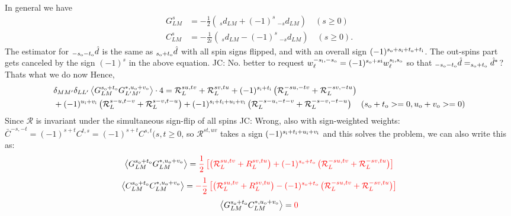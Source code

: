 \documentclass[reprint,prd, superscriptaddress, tightenlines, longbibliography, nofootinbib, eqsecnum, amsfonts, amsmath, floatfix, notitlepage, onecolumn]{revtex4-1}
\newcommand{\si}[0]{{s_{\rm i}}}
\newcommand{\ti}[0]{{t_{\rm i}}}
\newcommand{\ui}[0]{{u_{\rm i}}}
\newcommand{\vi}[0]{{v_{\rm i}}}
\newcommand{\so}[0]{{s_{\rm o}}}
\renewcommand{\to}[0]{{t_{\rm o}}}
\newcommand{\uo}[0]{{u_{\rm o}}}
\newcommand{\vo}[0]{{v_{\rm o}}}
\newcommand{\av}[1]{\left\langle #1 \right\rangle}
\newcommand{\red}[1]{\color{red}#1 \color{black} }
\newcommand{\JC}[1]{\color{red}JC: #1\color{black}}
\begin{document}
In general we have
\begin{eqnarray*}
		G^{s}_{LM} &= -\frac 12\left(\:_s d_{LM} + (-1)^s \:_{-s} d_{LM}\right) \quad (s \geq 0) \\
		C^{s}_{LM} &=-\frac 1{2i} \left( \:_s d_{LM} - (-1)^s \:_{-s} d_{LM} \right) \quad (s \geq 0).
\end{eqnarray*}
The estimator for $_{-\so - \to}\hat d$ is the same as $_{\so + \to}\hat d$ with all spin signs flipped, and with an overall sign $(-1)^{\so + \si + \to + \ti}$. The out-spins part gets canceled by the sign $(-1)^s$ in the above equation. \JC{No. better to request $w_\ell^{-\si, -\so} = (-1)^{\so + si}w_\ell^{\si,\so} $ so that $_{-\so - \to}\hat d = _{\so + \to}\hat d^*$? Thats what we do now}
Hence,
\begin{equation}
\begin{split}
			&\delta_{MM'}\delta_{LL'}\av{G^{\so + \to}_{LM} G^{*,\uo + \vo}_{L'M'} }\cdot 4 =\mathcal R^{su, tv}_L + \mathcal R^{sv, tu}_L + (-1)^{\si + \ti}\left(\mathcal R^{-su, -tv}_L + \mathcal R_L^{-sv, -tu} \right) \\&+ (-1)^{\ui + \vi}\left(\mathcal R^{s-u, t-v}_L + \mathcal R_L^{s-v, t-u}\right) + (-1)^{\si + \ti + \ui + \vi}\left(\mathcal R^{-s-u, -t-v}_L + \mathcal R_L^{-s-v, -t-u}\right)\quad (\so + \to >= 0, \uo + \vo >= 0)
\end{split}
\end{equation}
Since $\mathcal R$ is invariant under the simultaneous sign-flip of all spins \JC{Wrong, also with sign-weighted weights: $\bar C^{-s, -t} = (-1)^{s + t}C^{t,s} =  (-1)^{s + t}C^{s,t} (s,t \geq 0$, so $\mathcal R^{st, uv}$ takes a sign $(-1)^{\si + \ti + \ui + \vi}$ and this solves the problem}, we can also write this as:
\begin{equation}
	\av{G^{\so + \to}_{LM} G^{*, \uo + \vo}_{L M} } = \red{\frac 12\left[ \left(\mathcal R^{su, tv}_L  + R^{sv, tu}_L\right) + (-1)^{\so + \to} \left(\mathcal R^{-su, tv}_L + \mathcal R_L^{-sv, tu} \right) \right]}
\end{equation}
\begin{equation}
	\av{C^{\so + \to}_{LM} C^{*, \uo + \vo}_{L M} } =\red{- \frac 12\left[ \left(\mathcal R^{su, tv}_L  + R^{sv, tu}_L\right)  - (-1)^{\so + \to} \left(\mathcal R^{-su, tv}_L + \mathcal R_L^{-sv, tu} \right) \right]}
\end{equation}
\begin{equation}
	\av{G^{\so + \to}_{LM} C^{*, \uo + \vo}_{L M} } =\red{0}
\end{equation}
\color{red}{Pfeew}\color{black}
\end{document}

